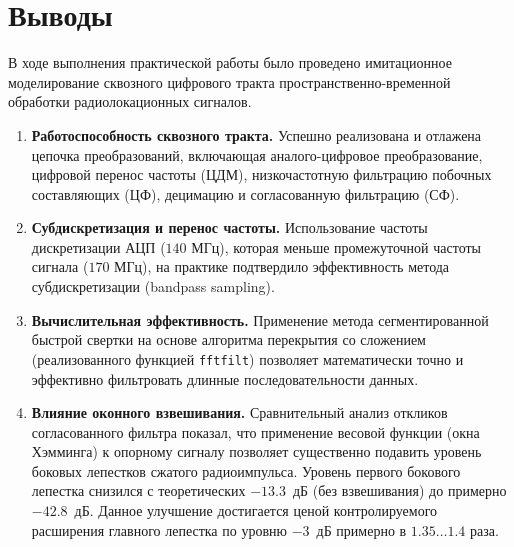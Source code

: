\section{Выводы}

В ходе выполнения практической работы было проведено имитационное моделирование сквозного цифрового тракта пространственно-временной обработки радиолокационных сигналов.%

\begin{enumerate}
    \item \textbf{Работоспособность сквозного тракта.} Успешно реализована и отлажена цепочка преобразований, включающая аналого-цифровое преобразование, цифровой перенос частоты (ЦДМ), низкочастотную фильтрацию побочных составляющих (ЦФ), децимацию и согласованную фильтрацию (СФ).%
    
    \item \textbf{Субдискретизация и перенос частоты.} Использование частоты дискретизации АЦП ($140$ МГц), которая меньше промежуточной частоты сигнала ($170$ МГц), на практике подтвердило эффективность метода субдискретизации (bandpass sampling).%
    
    \item \textbf{Вычислительная эффективность.} Применение метода сегментированной быстрой свертки на основе алгоритма перекрытия со сложением (реализованного функцией \texttt{fftfilt}) позволяет математически точно и эффективно фильтровать длинные последовательности данных.%
    
\item \textbf{Влияние оконного взвешивания.} Сравнительный анализ откликов согласованного фильтра показал, что применение весовой функции (окна Хэмминга) к опорному сигналу позволяет существенно подавить уровень боковых лепестков сжатого радиоимпульса. Уровень первого бокового лепестка снизился с теоретических $-13.3$~дБ (без взвешивания) до примерно $-42.8$~дБ. Данное улучшение достигается ценой контролируемого расширения главного лепестка по уровню $-3$~дБ примерно в $1.35 \dots 1.4$ раза.
\end{enumerate}